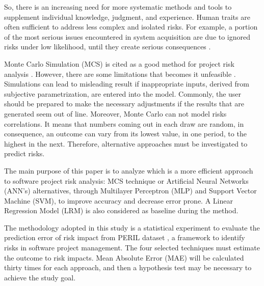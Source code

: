 \documentclass[a4paper,twoside]{article}
\begin{document}
So, there is an increasing need for more systematic methods and tools to supplement individual knowledge, judgment, and experience. Human traits are often sufficient to address less complex and isolated risks. For example, a portion of the most serious issues encountered in system acquisition are due to ignored risks under low likelihood, until they create serious consequences \cite{higuera1996software}.

Monte Carlo Simulation (MCS) is cited as a good method for project risk analysis \cite{PMBOK2008}. However, there are some limitations that becomes it unfeasible \cite{Ibbotson2005}. Simulations can lead to misleading result if inappropriate inputs, derived from subjective parametrization, are entered into the model. Commonly, the user should be prepared to make the necessary adjustments if the results that are generated seem out of line. Moreover, Monte Carlo can not model risks correlations. It means that numbers coming out in each draw are random, in consequence, an outcome can vary from its lowest value, in one period, to the highest in the next. Therefore, alternative approaches must be investigated to predict risks.

The main purpose of this paper is to analyze which is a more efficient approach to software project risk analysis: MCS technique or Artificial Neural Networks (ANN's) alternatives, through Multilayer Perceptron (MLP) and Support Vector Machine (SVM), to improve accuracy and decrease error prone. A Linear Regression Model (LRM) is also considered as baseline during the method.

The methodology adopted in this study is a statistical experiment to evaluate the prediction error of risk impact from PERIL dataset \cite{kendrick2003identifying}, a framework to identify risks in software project management. The four selected techniques must estimate the outcome to risk impacts. Mean Absolute Error (MAE) will be calculated thirty times for each approach, and then a hypothesis test may be necessary to achieve the study goal.
\end{document}

